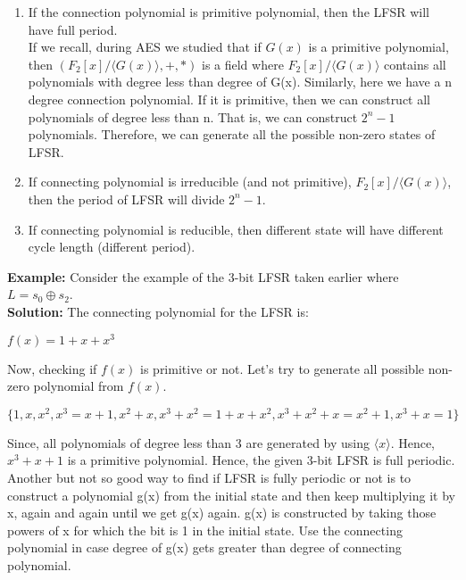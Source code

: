 \documentclass[11pt]{article}
\begin{document}
\begin{enumerate}
    \item If the connection polynomial is primitive polynomial, then the LFSR will have full period.\\
    \newline
    If we recall, during AES we studied that if $G(x)$ is a primitive polynomial, then $(F_2[x]/\langle G(x)\rangle, +, *)$ is a field where $F_2[x]/\langle G(x)\rangle$ contains all polynomials with degree less than degree of G(x). Similarly, here we have a n degree connection polynomial. If it is primitive, then we can construct all polynomials of degree less than n. That is, we can construct $2^n - 1$ polynomials. Therefore, we can generate all the possible non-zero states of LFSR.

    \item If connecting polynomial is irreducible (and not primitive), $F_2[x]/\langle G(x)\rangle$, then the period of LFSR will divide $2^n-1$.

    \item If connecting polynomial is reducible, then different state will have different cycle length (different period).
\end{enumerate}
\textbf{Example:} Consider the example of the 3-bit LFSR taken earlier where $L = s_0 \oplus s_2$.\\
\textbf{Solution:} The connecting polynomial for the LFSR is:
\begin{center}
    $f(x) = 1 + x + x^3$
\end{center}
Now, checking if $f(x)$ is primitive or not. Let's try to generate all possible non-zero polynomial from $f(x)$.
\begin{center}
    $\{1, x, x^2, x^3 = x + 1, x^2 + x, x^3 + x^2 = 1 + x + x^2, x^3 + x^2 + x = x^2 + 1, x^3 + x = 1\}$
\end{center}
Since, all polynomials of degree less than 3 are generated by using $\langle x \rangle$. Hence, $x^3 + x + 1$ is a primitive polynomial. Hence, the given 3-bit LFSR is full periodic.\\ 
Another but not so good way to find if LFSR is fully periodic or not is to construct a polynomial g(x) from the initial state and then keep multiplying it by x, again and again until we get g(x) again. g(x) is constructed by taking those powers of x for which the bit is 1 in the initial state. Use the connecting polynomial in case degree of g(x) gets greater than degree of connecting polynomial.
\end{document}
